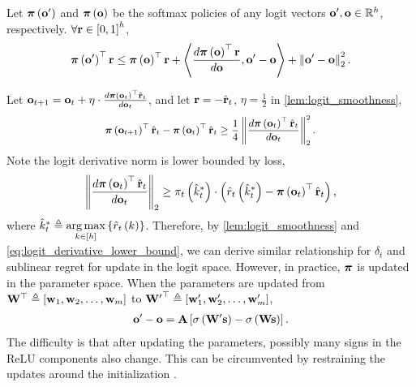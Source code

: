 \begin{lem}
\label{lem:logit_smoothness}
Let ${\boldsymbol{\pi}}\left( {\mathbf{o}}^\prime \right)$ and ${\boldsymbol{\pi}}\left( {\mathbf{o}} \right)$ be the softmax policies of any logit vectors ${\mathbf{o}}^\prime, {\mathbf{o}} \in {\mathbb{R}}^h$, respectively. $\forall {\mathbf{r}} \in \left[ 0, 1\right]^h$,
\begin{equation*}
    {\boldsymbol{\pi}}\left( {\mathbf{o}}^\prime \right)^\top {\mathbf{r}} \le {\boldsymbol{\pi}}\left( {\mathbf{o}} \right)^\top {\mathbf{r}} + \left\langle \frac{d {\boldsymbol{\pi}}\left( {\mathbf{o}} \right)^\top {\mathbf{r}}}{d {\mathbf{o}}}, {\mathbf{o}}^\prime - {\mathbf{o}} \right\rangle + \left\| {\mathbf{o}}^\prime - {\mathbf{o}} \right\|_2^2.
\end{equation*}
\end{lem}
Let ${\mathbf{o}}_{t+1} = {\mathbf{o}}_{t} + \eta \cdot \frac{d {\boldsymbol{\pi}}\left( {\mathbf{o}}_{t} \right)^\top \hat{{\mathbf{r}}}_t}{d {\mathbf{o}}_{t}}$, and let ${\mathbf{r}} = - \hat{{\mathbf{r}}}_t$, $\eta = \frac{1}{2}$ in \cref{lem:logit_smoothness},
\begin{equation*}
\begin{split}
\small
    \rvpi\left( \rvo_{t+1} \right)^\top \hat{\rvr}_t - \rvpi\left( \rvo_{t} \right)^\top \hat{\rvr}_t \ge\frac{1}{4} \left\| \frac{d \rvpi\left( \rvo_{t} \right)^\top \hat{\rvr}_t}{d \rvo_{t}} \right\|_2^2.
\end{split}
\end{equation*}
Note the logit derivative norm is lower bounded by loss,
\begin{equation}
\label{eq:logit_derivative_lower_bound}
\begin{split}
    \left\| \frac{d {\boldsymbol{\pi}}\left( {\mathbf{o}}_{t} \right)^\top \hat{{\mathbf{r}}}_t}{d {\mathbf{o}}_{t}} \right\|_2 \ge \pi_t\left(\hat{k}_t^*\right) \cdot \left( \hat{r}_t\left(\hat{k}_t^*\right) - {\boldsymbol{\pi}}\left( {\mathbf{o}}_{t} \right)^\top \hat{{\mathbf{r}}}_t \right),
\end{split}
\end{equation}
where $\hat{k}_t^* \triangleq \operatorname*{arg\,max}\limits_{ k \in [h]}{\left\{ \hat{r}_t\left(k\right) \right\}}$. Therefore, by \cref{lem:logit_smoothness} and \cref{eq:logit_derivative_lower_bound}, we can derive similar relationship for $\delta_t$ and sublinear regret for update in the logit space. However, in practice, ${\boldsymbol{\pi}}$ is updated in the parameter space. When the parameters are updated from ${\mathbf{W}}^\top \triangleq \left[ {\mathbf{w}}_1, {\mathbf{w}}_2, \dots, {\mathbf{w}}_m \right]$ to ${{\mathbf{W}}^\prime}^\top \triangleq \left[ {\mathbf{w}}_1^\prime, {\mathbf{w}}_2^\prime, \dots, {\mathbf{w}}_m^\prime \right]$,
\begin{equation*}
\begin{split}
    {\mathbf{o}}^\prime - {\mathbf{o}} = {\mathbf{A}} \left[ \sigma \left( {\mathbf{W}}^\prime {\mathbf{s}} \right) - \sigma \left( {\mathbf{W}} {\mathbf{s}} \right) \right].
\end{split}
\end{equation*}
The difficulty is that after updating the parameters, possibly many signs in the ReLU components also change. This can be circumvented by restraining the updates around the initialization \citep{li2018learning}.


